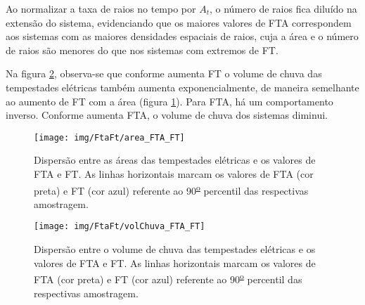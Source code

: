 


Ao normalizar a taxa de raios no tempo por $A_t$, o número de raios fica diluído na extensão do sistema, evidenciando que os maiores valores de FTA correspondem aos sistemas com as maiores densidades espaciais de raios, cuja a área e o número de raios são menores do que nos sistemas com extremos de FT.

Na figura \ref{volchuvaFTAFT}, observa-se que conforme aumenta FT o volume de chuva das tempestades elétricas também aumenta exponencialmente, de maneira semelhante ao aumento de FT com a área (figura \ref{areaFTAFTA}). Para FTA, há um comportamento inverso. Conforme aumenta FTA, o volume de chuva dos sistemas diminui.  


\begin{figure}[!ht]
  \centering
  \texttt{[image: img/FtaFt/area\_FTA\_FT]}   
  \caption{Dispersão entre as áreas das tempestades elétricas e os valores de FTA e FT. As linhas horizontais marcam os valores de FTA (cor preta) e FT (cor azul) referente ao 90\textsuperscript{\underline{o}} percentil das respectivas amostragem.}
  \label{areaFTAFTA}  
\end{figure}

\begin{figure}[!hb]
  \centering 
  \texttt{[image: img/FtaFt/volChuva\_FTA\_FT]}
  \caption{Dispersão entre o volume de chuva das tempestades elétricas e os valores de FTA e FT.  As linhas horizontais marcam os valores de FTA (cor preta) e FT (cor azul) referente ao 90\textsuperscript{\underline{o}} percentil das respectivas amostragem.}
  \label{volchuvaFTAFT}
\end{figure}


